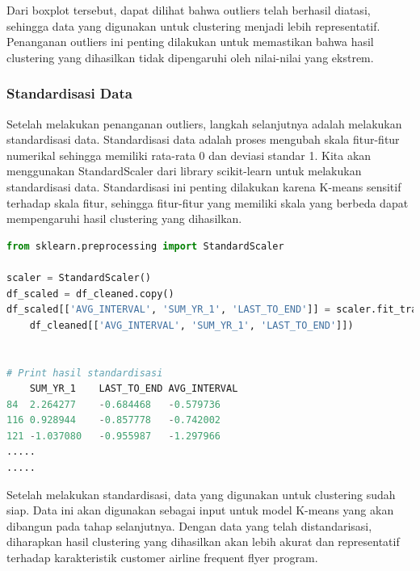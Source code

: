 Dari boxplot tersebut, dapat dilihat bahwa outliers telah berhasil diatasi, sehingga data yang digunakan untuk clustering menjadi lebih representatif. Penanganan outliers ini penting dilakukan untuk memastikan bahwa hasil clustering yang dihasilkan tidak dipengaruhi oleh nilai-nilai yang ekstrem.

\subsubsection{Standardisasi Data}
Setelah melakukan penanganan outliers, langkah selanjutnya adalah melakukan standardisasi data. Standardisasi data adalah proses mengubah skala fitur-fitur numerikal sehingga memiliki rata-rata 0 dan deviasi standar 1. Kita akan menggunakan StandardScaler dari library scikit-learn untuk melakukan standardisasi data. Standardisasi ini penting dilakukan karena K-means sensitif terhadap skala fitur, sehingga fitur-fitur yang memiliki skala yang berbeda dapat mempengaruhi hasil clustering yang dihasilkan.

\begin{lstlisting}[language=Python]
from sklearn.preprocessing import StandardScaler

scaler = StandardScaler()
df_scaled = df_cleaned.copy()
df_scaled[['AVG_INTERVAL', 'SUM_YR_1', 'LAST_TO_END']] = scaler.fit_transform(
    df_cleaned[['AVG_INTERVAL', 'SUM_YR_1', 'LAST_TO_END']])


# Print hasil standardisasi
    SUM_YR_1	LAST_TO_END	AVG_INTERVAL
84	2.264277	-0.684468	-0.579736
116	0.928944	-0.857778	-0.742002
121	-1.037080	-0.955987	-1.297966
.....
.....
\end{lstlisting}

Setelah melakukan standardisasi, data yang digunakan untuk clustering sudah siap. Data ini akan digunakan sebagai input untuk model K-means yang akan dibangun pada tahap selanjutnya. Dengan data yang telah distandarisasi, diharapkan hasil clustering yang dihasilkan akan lebih akurat dan representatif terhadap karakteristik customer airline frequent flyer program.





